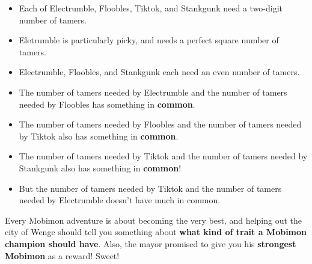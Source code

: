 \begin{itemize}
\item Each of Electrumble, Floobles, Tiktok, and Stankgunk need a two-digit
  number of tamers.
\item Eletrumble is particularly picky, and needs a perfect square number of
  tamers.
\item Electrumble, Floobles, and Stankgunk each need an even number of tamers.
\item The number of tamers needed by Electrumble and the number of tamers needed
  by Floobles has something in \textbf{common}.
\item The number of tamers needed by Floobles and the number of tamers needed by
  Tiktok also has something in \textbf{common}.
\item The number of tamers needed by Tiktok and the number of tamers needed by
  Stankgunk also has something in \textbf{common}!
\item But the number of tamers needed by Tiktok and the number of tamers needed
  by Electrumble doesn't have much in common.
\end{itemize}

Every Mobimon adventure is about becoming the very best, and helping out the
city of Wenge should tell you something about \textbf{what kind of trait a
  Mobimon champion should have}. Also, the mayor promised to give you his
\textbf{strongest Mobimon} as a reward! Sweet!


